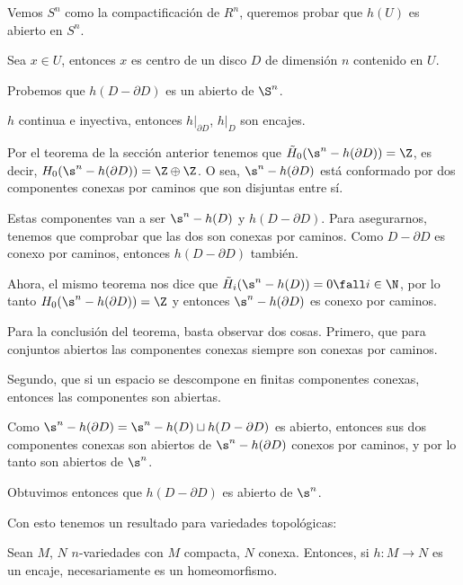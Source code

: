\begin{dem}

    Vemos $S^n$ como la compactificación de $R^n$, queremos probar que $h(U)$ es abierto en $S^n$.

    Sea $x\in U$, entonces $x$ es centro de un disco $D$ de dimensión $n$ contenido en $U$.

    Probemos que $h(D-\partial D)$ es un abierto de $\S^n$.

    $h$ continua e inyectiva, entonces $h|_{\partial D}$, $h|_{D}$ son encajes.

    Por el teorema de la sección anterior  tenemos que $\tilde{H}_0(\s^n - h(\partial D))=\Z$, es decir, $H_0(\s^n - h(\partial D))=\Z\oplus\Z$. O sea, $\s^n - h(\partial D)$ está conformado por dos componentes conexas por caminos que son disjuntas entre sí. 
    
    Estas componentes van a ser $\s^n-h(D)$ y $h(D-\partial D)$. Para asegurarnos, tenemos que comprobar que las dos son conexas por caminos. Como $D-\partial D$ es conexo por caminos, entonces $h(D-\partial D)$ también.
    
    Ahora, el mismo teorema nos dice que $\tilde{H}_i(\s^n - h(D))=0\fall i\in\N$, por lo tanto $H_0(\s^n - h(\partial D))=\Z$ y entonces $\s^n - h(\partial D)$ es conexo por caminos.

    Para la conclusión del teorema, basta observar dos cosas. Primero, que para conjuntos abiertos las componentes conexas siempre son conexas por caminos.
    
    Segundo, que si un espacio se descompone en finitas componentes conexas, entonces las componentes son abiertas.
    
    Como $\s^n-h(\partial D) = \s^n-h(D) \sqcup h(D-\partial D) $ es abierto, entonces sus dos componentes conexas son abiertos de $\s^n-h(\partial D)$ conexos por caminos, y por lo tanto son abiertos de $\s^n$.

    Obtuvimos entonces que $h(D-\partial D)$ es abierto de $\s^n$.
\end{dem}

Con esto tenemos un resultado para variedades topológicas:

\begin{cor}

    Sean $M$, $N$ $n$-variedades con $M$ compacta, $N$ conexa. Entonces, si $h:M\to N$ es un encaje, necesariamente es un homeomorfismo.

\end{cor}

